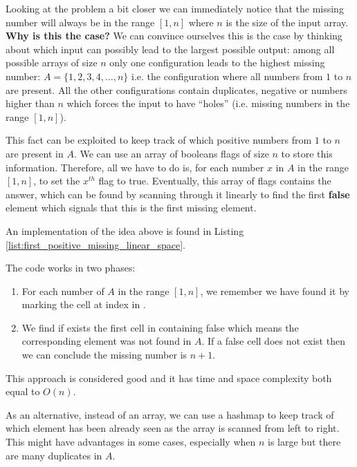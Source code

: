 Looking at the problem a bit closer we can immediately notice that the missing number will always be
in the range $[1,n]$ where $n$ is the size of the input array. \textbf{Why is this the case?} 
We can convince ourselves this is the case by thinking about which input can possibly lead to the largest possible output: among
all possible arrays of size $n$ only one configuration leads to the highest missing number: $A =
\{1,2,3,4, \ldots ,n\}$ i.e. the configuration where all numbers from $1$ to $n$ are present. All the other configurations contain duplicates,
negative or numbers higher than $n$ which forces the input to have ``holes'' (i.e. missing numbers in the range $[1,n]$). 

This fact can be exploited to keep track of which positive numbers from
$1$ to $n$ are present in $A$. We can use an array of booleans flags of size $n$ to store this information. Therefore, all we have to do is, for each number  $x$ in $A$ in the range $[1,n]$, to set the $x^{th}$ flag to true.
Eventually, this array of flags contains the answer, which can be found by scanning through it linearly to find the first \textbf{false} element which signals that this is the first missing element.

An implementation of the idea above is found in Listing \ref{list:first_positive_missing_linear_space}.




The code works in two phases:
\begin{enumerate}
	\item For each number  of $A$ in the range $[1,n]$, we remember we have found it by marking the cell at index  in .
	\item We find if exists the first cell in  containing false which means the corresponding element was not found in $A$. If a false cell does not exist then we can conclude the missing number is $n+1$.
\end{enumerate}

This approach is considered good and it has time and space complexity both equal to $O(n)$.

As an alternative, instead of an array, we can use a hashmap to keep track of which element has
been already seen as the array is scanned from left to right. This might have advantages in some cases, especially when $n$ is large but there are many duplicates in $A$. 



